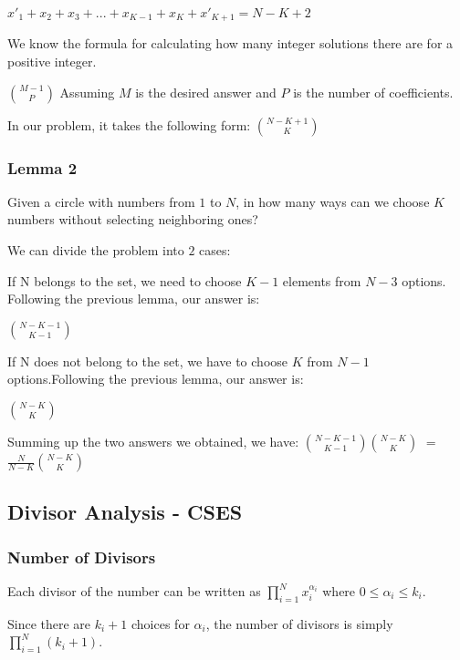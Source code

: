                 $x'_1 + x_2 + x_3 + ... + x_{\scriptscriptstyle K-1} + x_{\scriptscriptstyle K} + x'_{\scriptscriptstyle K+1} = N - K + 2$
        
                
                We know the formula for calculating how many integer solutions there are for a positive integer.
        
                $\binom{M-1}{P}$ Assuming $M$ is the desired answer and $P$ is the number of coefficients.
        
                In our problem, it takes the following form: $\binom{N-K+1}{K}$
    
            \subsubsection{Lemma 2}
            \tab Given a circle with numbers from $1$ to $N$, in how many ways can we choose $K$ numbers without selecting neighboring ones?

            We can divide the problem into $2$ cases:

            If N belongs to the set, we need to choose $K-1$ elements from $N-3$ options. Following the previous lemma, our answer is:
            
            $\binom{N-K-1}{K-1}$
            
            
            If N does not belong to the set, we have to choose $K$ from $N-1$ options.Following the previous lemma, our answer is:
            
            $\binom{N-K}{K}$

            
            Summing up the two answers we obtained, we have:  $\binom{N-K-1}{K-1}\binom{N-K}{K}$ $=$ $\frac{N}{N-K}\binom{N-K}{K}$
        \subsection{Divisor Analysis - CSES} 
            \subsubsection{Number of Divisors}
                    \tab Each divisor of the number can be written as $\prod_{i = 1}^N x_i^{\alpha_i}$
                    where $0 \leq \alpha_i \leq k_i$.
                    
                    Since there are $k_i + 1$ choices for $\alpha_i$, the number of divisors is
                    simply $\prod_{i = 1}^N (k_i + 1)$.
                    
